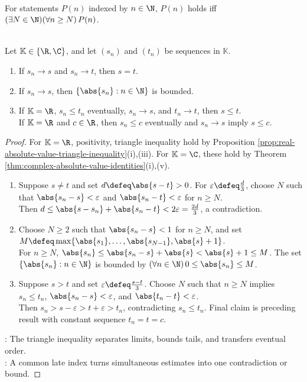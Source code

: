 \begin{convention} \label{conv:eventual-sequence-property} \\
For statements $P(n)$ indexed by $n\in\N$, $P(n)$ holds  iff $(\exists N\in\N)(\forall n\geq N)\,P(n)$.
\end{convention}

\begin{proposition} \label{prop:convergent-sequence-basic-consequences} \\
Let $\mathbb{K}\in\{\R,\C\}$, and let $(s_n)$ and $(t_n)$ be sequences in $\mathbb{K}$.
\begin{enumerate}[label=(\roman*)]
\setlength{\itemsep}{0pt}
\item If $s_n\to s$ and $s_n\to t$, then $s=t$.
\item If $s_n\to s$, then $\{\abs{s_n}:n\in\N\}$ is bounded.
\item If $\mathbb{K}=\R$, $s_n\leq t_n$ eventually, $s_n\to s$, and $t_n\to t$, then $s\leq t$.\\
If $\mathbb{K}=\R$ and $c\in\R$, then $s_n\leq c$ eventually and $s_n\to s$ imply $s\leq c$.
\end{enumerate}
\begin{proof}
For $\mathbb{K}=\R$, positivity, triangle inequality hold by Proposition \ref{prop:real-absolute-value-triangle-inequality}(i),(iii). For $\mathbb{K}=\C$, these hold by Theorem \ref{thm:complex-absolute-value-identities}(i),(v).
\begin{enumerate}[label=(\roman*)]
\setlength{\itemsep}{0pt}
\item Suppose $s\neq t$ and set $d\defeq\abs{s-t}>0$. For $\varepsilon\defeq\frac{d}{3}$, choose $N$ such that $\abs{s_n-s}<\varepsilon$ and $\abs{s_n-t}<\varepsilon$ for $n\geq N$.\\
Then $d\leq\abs{s-s_n}+\abs{s_n-t}<2\varepsilon=\frac{2d}{3}$, a contradiction.
\item Choose $N\geq2$ such that $\abs{s_n-s}<1$ for $n\geq N$, and set $M\defeq\max\{\abs{s_1},\ldots,\abs{s_{N-1}},\abs{s}+1\}$.\\
For $n\geq N$, $\abs{s_n}\leq\abs{s_n-s}+\abs{s}<\abs{s}+1\leq M$. The set $\{\abs{s_n}:n\in\N\}$ is bounded by $(\forall n\in\N)\,0\leq\abs{s_n}\leq M$.
\item Suppose $s>t$ and set $\varepsilon\defeq\frac{s-t}{3}$. Choose $N$ such that $n\geq N$ implies $s_n\leq t_n$, $\abs{s_n-s}<\varepsilon$, and $\abs{t_n-t}<\varepsilon$.\\
Then $s_n>s-\varepsilon>t+\varepsilon>t_n$, contradicting $s_n\leq t_n$. Final claim is preceding result with constant sequence $t_n=t=c$.
\end{enumerate}
: The triangle inequality separates limits, bounds tails, and transfers eventual order.\\
: A common late index turns simultaneous estimates into one contradiction or bound.
\end{proof}
\end{proposition}

